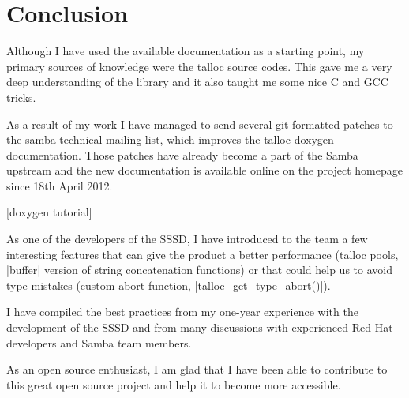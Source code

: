 \chapter{Conclusion}

Although I have used the available documentation as a starting point, my primary
sources of knowledge were the talloc source codes. This gave me a very deep
understanding of the library and it also taught me some nice C and GCC tricks.

As a result of my work I have managed to send several git-formatted patches to
the samba-technical mailing list, which improves the talloc doxygen
documentation. Those patches have already become a part of the Samba upstream
and the new documentation is available online on the project homepage since
18th April 2012.

[doxygen tutorial]

As one of the developers of the SSSD, I have introduced to the team a few
interesting features that can give the product a better performance (talloc
pools, |buffer| version of string concatenation functions) or that could help
us to avoid type mistakes (custom abort function, |talloc_get_type_abort()|).

I have compiled the best practices from my one-year experience with the
development of the SSSD and from many discussions with experienced Red Hat
developers and Samba team members.

As an open source enthusiast, I am glad that I have been able to contribute to
this great open source project and help it to become more accessible.


% 
